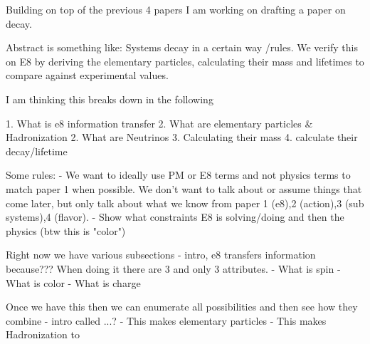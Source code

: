 Building on top of the previous 4 papers I am working on drafting a paper on decay.

Abstract is something like: Systems decay in a certain way /rules. We verify this on E8 by deriving the elementary particles, calculating their mass and lifetimes to compare against experimental values.

I am thinking this breaks down in the following

1. What is e8 information transfer
2. What are elementary particles & Hadronization
2. What are Neutrinos
3. Calculating their mass
4. calculate their decay/lifetime

Some rules:
- We want to ideally use PM or E8 terms and not physics terms to match paper 1 when possible. We don't want to talk about or assume things that come later, but only talk about what we know from paper 1 (e8),2 (action),3 (sub systems),4 (flavor).
- Show what constraints E8 is solving/doing and then the physics (btw this is "color")

Right now we have various subsections
- intro, e8 transfers information because???  When doing it there are 3 and only 3 attributes. 
- What is spin
- What is color
- What is charge

Once we have this then we can enumerate all possibilities and then see how they combine
- intro called ...?
- This makes elementary particles
- This makes Hadronization to 